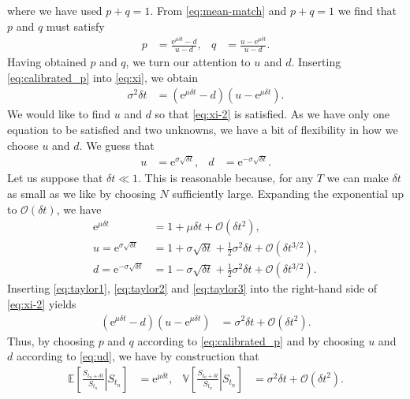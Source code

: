 \documentclass[12pt]{book}
\numberwithin{equation}{chapter}
\theoremstyle{plain}
\numberwithin{theorem}{section}
\theoremstyle{definition}
\numberwithin{exercise}{chapter}
\newcommand{\<}{\langle}
\renewcommand{\>}{\rangle}
\renewcommand{\(}{\left(}
\renewcommand{\)}{\right)}
\renewcommand{\[}{\left[}
\renewcommand{\]}{\right]}
\newcommand\Eb{\mathds{E}}
\newcommand\Vb{\mathds{V}}
\newcommand\Oc{\mathscr{O}}
\newcommand\sig{\sigma}
\newcommand\del{\delta}
\newcommand\ee{\mathrm{e}}
\theoremstyle{definition}
\numberwithin{question}{section}
\begin{document}
where we have used $p+q=1$.  From \eqref{eq:mean-match} and $p+q=1$ we find that $p$ and $q$ must satisfy
\begin{align} 
p 
	&= \frac{\ee^{\mu \delta t} - d}{u - d} , &
q
	&=	\frac{u - \ee^{\mu \delta t}}{u - d}.	\label{eq:calibrated_p}
\end{align}
Having obtained $p$ and $q$, we turn our attention to $u$ and $d$.
Inserting \eqref{eq:calibrated_p} into \eqref{eq:xi}, we obtain
\begin{align}
\sig^2 \del t
	&= ( \ee^{\mu \delta t} - d )( u - \ee^{\mu \delta t} ) . \label{eq:xi-2}
\end{align}
We would like to find $u$ and $d$ so that \eqref{eq:xi-2} is satisfied.  
As we have only one equation to be satisfied and two unknowns, we have a bit of flexibility in how we choose $u$ and $d$.
We guess that
\begin{align}
u &= \ee^{\sigma \sqrt{\delta t}} , &
d &= \ee^{-\sigma \sqrt{\delta t}}. \label{eq:ud}
\end{align}
Let us suppose that  $\delta t \ll 1$.  This is reasonable because, for any $T$ we can make $\del t$ as small as we like by choosing $N$ sufficiently large.  Expanding the exponential up to $\Oc(\del t)$, we have
\begin{align} 
\ee^{\mu \delta t} &= 1 + \mu \delta t + \Oc(\delta t^2), \label{eq:taylor1} \\ 
	u =  \ee^{\sig \sqrt{\del t}} &= 1 + \sigma \sqrt{\delta t} + \frac{1}{2} \sigma^2 \delta t + \Oc(\delta t^{3/2}), \label{eq:taylor2} \\
	d =  \ee^{- \sig \sqrt{\del t}} &= 1 - \sigma \sqrt{\delta t} + \frac{1}{2} \sigma^2 \delta t + \Oc(\delta t^{3/2}). \label{eq:taylor3}
\end{align}
Inserting \eqref{eq:taylor1}, \eqref{eq:taylor2} and \eqref{eq:taylor3} into the right-hand side of \eqref{eq:xi-2} yields
\begin{align}
( \ee^{\mu \delta t} - d )( u - \ee^{\mu \delta t} )
	&=	\sig^2 \del t + \Oc( \del t^2) .
\end{align}
Thus, by choosing $p$ and $q$ according to \eqref{eq:calibrated_p} and by choosing $u$ and $d$ according to \eqref{eq:ud}, we have by construction that
\begin{align}
\Eb \[ \left. \frac{S_{{t_n} + \delta t}}{S_{t_n}} \right| S_{t_n}\] 
	&= \ee^{\mu \delta t}, &
\Vb \[ \left. \frac{S_{{t_n} + \delta t}}{S_{t_n}} \right| S_{t_n} \] 
	&= \sigma^2 \delta t + \Oc(\delta t^{2}).
\end{align}
\end{document}
